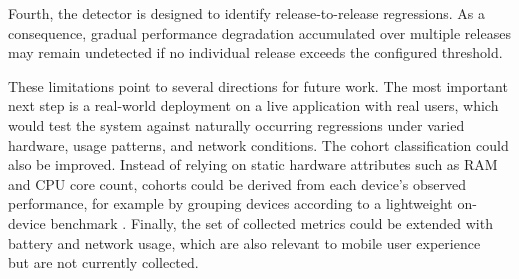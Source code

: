 
Fourth, the detector is designed to identify release-to-release regressions. As a consequence, gradual performance degradation accumulated over multiple releases may remain undetected if no individual release exceeds the configured threshold.

These limitations point to several directions for future work. The most important next step is a real-world deployment on a live application with real users, which would test the system against naturally occurring regressions under varied hardware, usage patterns, and network conditions. The cohort classification could also be improved. Instead of relying on static hardware attributes such as RAM and CPU core count, cohorts could be derived from each device's observed performance, for example by grouping devices according to a lightweight on-device benchmark . Finally, the set of collected metrics could be extended with battery and network usage, which are also relevant to mobile user experience~\cite{Saraiva} but are not currently collected.

